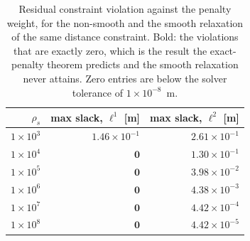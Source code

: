 \begin{table}[htbp]
  \centering
  \small
  \caption{Residual constraint violation against the penalty weight, for the non-smooth and the smooth relaxation of the same distance constraint. Bold: the violations that are exactly zero, which is the result the exact-penalty theorem predicts and the smooth relaxation never attains. Zero entries are below the solver tolerance of $1\times 10^{-8}$~m.}
  \label{res:tab:penalty}
  \begin{tabular}{rrr}
    \toprule
    $\rho_s$ & max slack, $\ell^1$ [m] & max slack, $\ell^2$ [m] \\
    \midrule
    $1\times 10^{3}$ & $1.46\times 10^{-1}$ & $2.61\times 10^{-1}$ \\
    $1\times 10^{4}$ & $\mathbf{0}$ & $1.30\times 10^{-1}$ \\
    $1\times 10^{5}$ & $\mathbf{0}$ & $3.98\times 10^{-2}$ \\
    $1\times 10^{6}$ & $\mathbf{0}$ & $4.38\times 10^{-3}$ \\
    $1\times 10^{7}$ & $\mathbf{0}$ & $4.42\times 10^{-4}$ \\
    $1\times 10^{8}$ & $\mathbf{0}$ & $4.42\times 10^{-5}$ \\
    \bottomrule
  \end{tabular}
\end{table}

